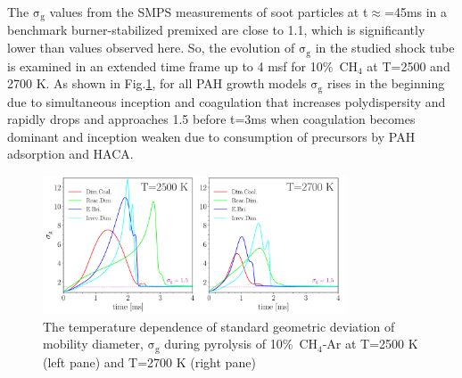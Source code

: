 The $\mathrm{\sigma_{g}}$ values from the SMPS measurements of soot particles at t$\approx$=45ms in a benchmark burner-stabilized premixed are close to 1.1, which is significantly lower than values observed here. So, the evolution of $\mathrm{\sigma_{g}}$ in the studied shock tube is examined in an extended time frame up to 4 msf for 10\%~$\mathrm{CH_4}$ at T=2500 and 2700 K. As shown in Fig.\ref{fig:shocktubesigmatime}, for all PAH growth models $\mathrm{\sigma_{g}}$ rises in the beginning due to simultaneous inception and coagulation that increases polydispersity and rapidly drops and approaches 1.5 before t=3ms when coagulation becomes dominant and inception weaken due to consumption of precursors by PAH adsorption and HACA.


\begin{figure}[H]
	\centering
	\includegraphics[width=0.8\textwidth]{Figures/Results/Shocktube/Agafonov2016/10CH4/sigma_time.pdf}
	\caption{The temperature dependence of standard geometric deviation of mobility diameter, $\mathrm{\sigma_{g}}$ during pyrolysis of 10\%~$\mathrm{CH_4}$-Ar at T=2500 K (left pane) and T=2700 K (right pane)}
	\label{fig:shocktubesigmatime} 
\end{figure}

